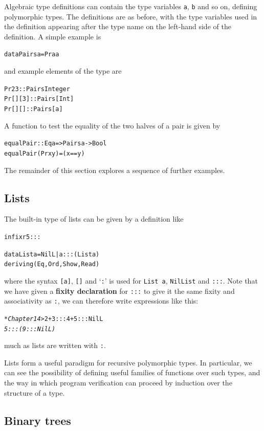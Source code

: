 Algebraic type definitions can contain the type variables \texttt{a}, \texttt{b}
and so on, defining polymorphic types. The definitions are as before, with the
type variables used in the definition appearing after the type name on the 
left-hand side of the definition. A simple example is
\begin{alltt}
data Pairs a = Pr a a
\end{alltt}
and example elements of the type are
\begin{alltt}
Pr 2 3    :: Pairs Integer
Pr [] [3] :: Pairs [Int]
Pr [] []  :: Pairs [a]
\end{alltt}
A function to test the equality of the two halves of a pair is given by
\begin{alltt}
equalPair :: Eq a => Pairs a -> Bool
equalPair (Pr x y) = (x==y)
\end{alltt}
The remainder of this section explores a sequence of further examples.

\subsection*{Lists}


The built-in type of lists can be given by a definition like
\begin{alltt}\minx{:::}
infixr 5 :::

data List a = NilL | a ::: (List a)
              deriving (Eq,Ord,Show,Read)
\end{alltt}
where the syntax \texttt{[a]}, \texttt{[]} and `\texttt{:}' is used for \texttt{List a},
\texttt{NilList} and \texttt{:::}. Note that we have given a \textbf{fixity declaration} for \texttt{:::} to give it the same fixity and associativity as \texttt{:}, we can therefore write expressions like this:
\begin{alltt}
\textsl{*Chapter14>} 2+3 ::: 4+5 ::: NilL
\textsl{5 ::: (9 ::: NilL)}
\end{alltt}
much as lists are written with \texttt{:}.

Lists form a useful paradigm
for recursive polymorphic types. In particular, we can see the possibility of
defining useful families of functions over such types, and the way in which
program verification can proceed by induction over the structure of a type.

\subsection*{Binary trees}

